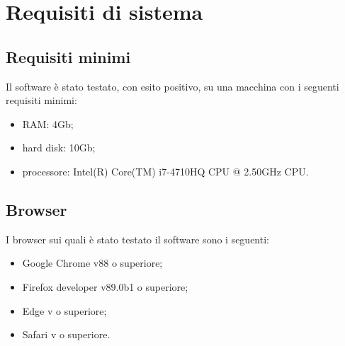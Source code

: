 \chapter{Requisiti di sistema}\label{RequisitiDiSistema}
\section{Requisiti minimi}\label{RequisitiDiSistemaRequisitiMinimi}
Il software è stato testato, con esito positivo, su una macchina con i seguenti requisiti minimi:
\begin{itemize}
  \item RAM: 4Gb;
  \item hard disk: 10Gb;
  \item processore: Intel(R) Core(TM) i7-4710HQ CPU @ 2.50GHz CPU.
\end{itemize}

\section{Browser}\label{RequisitiDiSistemaBrowser}
I browser sui quali è stato testato il software sono i seguenti:
\begin{itemize}
  \item Google Chrome v88 o superiore;
  \item Firefox developer v89.0b1 o superiore;
  \item Edge v o superiore;
  \item Safari v o superiore.
\end{itemize}
